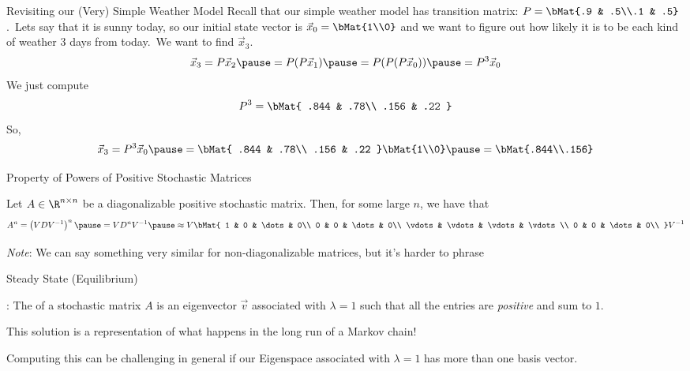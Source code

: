 \documentclass[xcoler=dvipsnames, aspectratio=169]{beamer}
\begin{document}
    \begin{frame}{Revisiting our (Very) Simple Weather Model}
        Recall that our simple weather model has transition matrix: $P=\bMat{.9 & .5\\.1 & .5}$.\pause\
        Lets say that it is sunny today, so our initial state vector is $\vec{x}_0 = \bMat{1\\0}$
        and we want to figure out how likely it is to be each kind of weather $3$ days from today.\pause\
        We want to find $\vec{x}_3$.\pause
        \[
            \vec{x}_3 = P\vec{x}_2\pause = P(P\vec{x}_1)\pause = P(P(P\vec{x}_0))\pause = P^3\vec{x}_0
        \]\pause
        We just compute
        \[
            P^3 = \bMat{
                .844 & .78\\
                .156 & .22
            }
        \]\pause
        So,
        \[
            \vec{x}_3 = P^3\vec{x}_0\pause = \bMat{
                .844 & .78\\
                .156 & .22
            }\bMat{1\\0}\pause = \bMat{.844\\.156}
        \]
    \end{frame}
    \begin{frame}{Property of Powers of Positive Stochastic Matrices}
        \begin{theorem}
            Let $A\in\R^{n\times n}$ be a diagonalizable positive stochastic matrix. Then, for some
            large $n$, we have that\pause
            \[
                A^n = \left(VDV^{-1}\right)^n\pause = VD^nV^{-1}\pause\approx V\bMat{
                    1 & 0 & \dots & 0\\
                    0 & 0 & \dots & 0\\
                    \vdots & \vdots & \vdots & \vdots\\
                    0 & 0 & \dots & 0\\
                }V^{-1}
            \]
        \end{theorem}\pause
        \emph{Note}: We can say something very similar for non-diagonalizable matrices, but it's
        harder to phrase
    \end{frame}
    \begin{frame}{Steady State (Equilibrium)}
        \begin{defn}
            \rText{Steady State}: The  of a stochastic matrix $A$ is an eigenvector
            $\vec{v}$ associated with $\lambda=1$ such that all the entries are \emph{positive} and
            sum to $1$.
        \end{defn}\pause
        This solution is a representation of what happens in the long run of a Markov chain!\pause

        Computing this can be challenging in general if our Eigenspace associated with $\lambda=1$
        has more than one basis vector.
    \end{frame}
\end{document}
